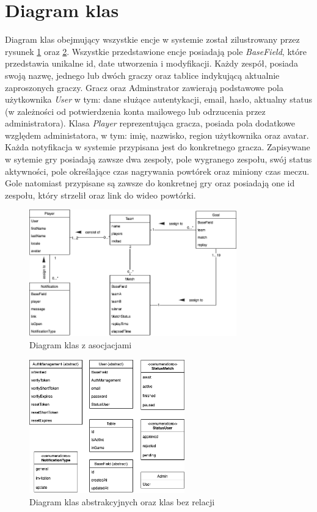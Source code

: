 \section{Diagram klas}
Diagram klas obejmujący wszystkie encje w systemie został zilustrowany przez rysunek \ref{fig:ClassDiagram} oraz \ref{fig:AbstractClassDiagram}. Wszystkie przedstawione encje posiadają pole \textit{BaseField}, które przedstawia unikalne id, date utworzenia i modyfikacji. Każdy zespół, posiada swoją nazwę, jednego lub dwóch graczy oraz tablice indykującą aktualnie zaproszonych graczy. Gracz oraz Adminstrator zawierają podstawowe pola użytkownika \textit{User} w tym: dane służące autentykacji, email, hasło, aktualny status (w zależności od potwierdzenia konta mailowego lub odrzucenia przez administratora). Klasa \textit{Player} reprezentująca gracza, posiada pola dodatkowe względem administatora, w tym: imię, nazwisko, region użytkownika oraz avatar. Każda notyfikacja w systemie przypisana jest do konkretnego gracza. Zapisywane w sytemie gry posiadają zawsze dwa zespoły, pole wygranego zespołu, swój status aktywności, pole określające czas nagrywania powtórek oraz miniony czas meczu. Gole natomiast przypisane są zawsze do konkretnej gry oraz posiadają one id zespołu, który strzelił oraz link do wideo powtórki.

\begin{figure}[h!]
    \centering
    \includegraphics[width=0.8\textwidth]{images/diagrams/class_diagram.png}
    \caption{Diagram klas z asocjacjami}
    \label{fig:ClassDiagram}
\end{figure}

\begin{figure}[h!]
    \centering
    \includegraphics[width=0.6\textwidth]{images/diagrams/class_diagram_rest.png}
    \caption{Diagram klas abstrakcyjnych oraz klas bez relacji}
    \label{fig:AbstractClassDiagram}
\end{figure}

